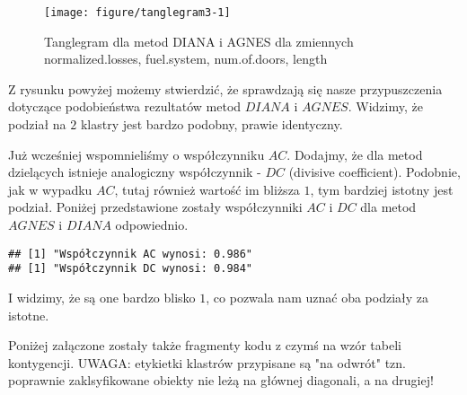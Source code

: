 \documentclass[12pt, a4paper]{article}\usepackage[]{graphicx}\usepackage[]{xcolor}
\makeatletter
\def\maxwidth{ %
  \ifdim\Gin@nat@width>\linewidth
    \linewidth
  \else
    \Gin@nat@width
  \fi
}
\newenvironment{kframe}{%
 \def\at@end@of@kframe{}%
 \ifinner\ifhmode%
  \def\at@end@of@kframe{\end{minipage}}%
  \begin{minipage}{\columnwidth}%
 \fi\fi%
 \def\FrameCommand##1{\hskip\@totalleftmargin \hskip-\fboxsep
 \colorbox{shadecolor}{##1}\hskip-\fboxsep
     \hskip-\linewidth \hskip-\@totalleftmargin \hskip\columnwidth}%
 \MakeFramed {\advance\hsize-\width
   \@totalleftmargin\z@ \linewidth\hsize
   \@setminipage}}%
 {\par\unskip\endMakeFramed%
 \at@end@of@kframe}
\newenvironment{knitrout}{}{} %
\makeatother
\begin{document}
\begin{knitrout}
\color{fgcolor}\begin{figure}[H]

{\centering \texttt{[image: figure/tanglegram3-1]} 

}

\caption[Tanglegram dla metod DIANA i AGNES dla zmiennych normalized.losses, fuel.system, num.of.doors, length]{Tanglegram dla metod DIANA i AGNES dla zmiennych normalized.losses, fuel.system, num.of.doors, length}\label{fig:tanglegram3}
\end{figure}

\end{knitrout}

Z rysunku powyżej możemy stwierdzić, że sprawdzają się nasze przypuszczenia dotyczące podobieństwa rezultatów metod $DIANA$ i $AGNES$. Widzimy, że podział na $2$ klastry jest bardzo podobny, prawie identyczny.

\par Już wcześniej wspomnieliśmy o współczynniku $AC$. Dodajmy, że dla metod dzielących istnieje analogiczny współczynnik - $DC$ (divisive coefficient). Podobnie, jak w wypadku $AC$, tutaj również wartość im bliższa $1$, tym bardziej istotny jest podział. Poniżej przedstawione zostały współczynniki $AC$ i $DC$ dla metod $AGNES$ i $DIANA$ odpowiednio.
\begin{knitrout}
\color{fgcolor}\begin{kframe}
\begin{verbatim}
## [1] "Współczynnik AC wynosi: 0.986"
## [1] "Współczynnik DC wynosi: 0.984"
\end{verbatim}
\end{kframe}
\end{knitrout}
I widzimy, że są one bardzo blisko $1$, co pozwala nam uznać oba podziały za istotne.
\par Poniżej załączone zostały także fragmenty kodu z czymś na wzór tabeli kontygencji. UWAGA: etykietki klastrów przypisane są "na odwrót" tzn. poprawnie zaklsyfikowane obiekty nie leżą na głównej diagonali, a na drugiej!
\end{document}
